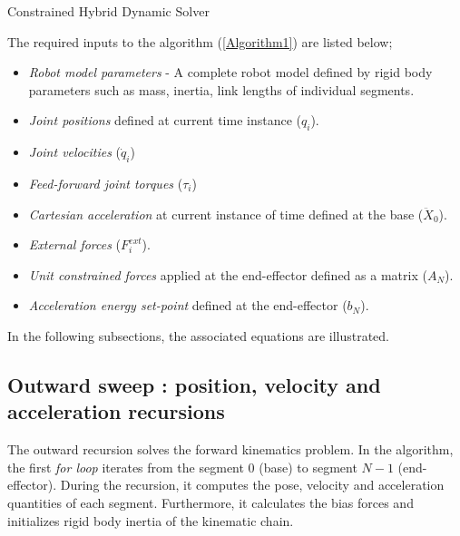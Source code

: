 \begin{algorithm}[h!]
{	 
}   

	\caption{Constrained Hybrid Dynamic Solver}
\end{algorithm}


The required inputs to the algorithm (\ref{Algorithm1}) are listed below;
\begin{itemize}
	\item \textit{Robot model parameters} - A complete robot model defined by rigid body parameters such as mass, inertia, link lengths of individual segments.
	\item \textit{Joint positions} defined at current time instance ($q_i$).
	\item \textit{Joint velocities} ($\dot{q}_i$)
	\item \textit{Feed-forward joint torques} ($\tau_i$)
	\item \textit{Cartesian acceleration} at current instance of time defined at the base ($\ddot{X}_0$).
	\item \textit{External forces} ($F^{ext}_i$).
	\item \textit{Unit constrained forces} applied at the end-effector defined as a matrix ($A_N$).
	\item \textit{Acceleration energy set-point} defined at the end-effector ($b_N$).
\end{itemize}

In the following subsections, the associated equations are illustrated.

\subsection{Outward sweep : position, velocity and acceleration recursions}
The outward recursion solves the forward kinematics problem. In the algorithm, the first \textit{for loop} iterates from the segment $0$ (base) to segment $N-1$ (end-effector). During the recursion, it computes the pose, velocity and acceleration quantities of each segment. Furthermore, it calculates the bias forces and initializes rigid body inertia of the kinematic chain. 

